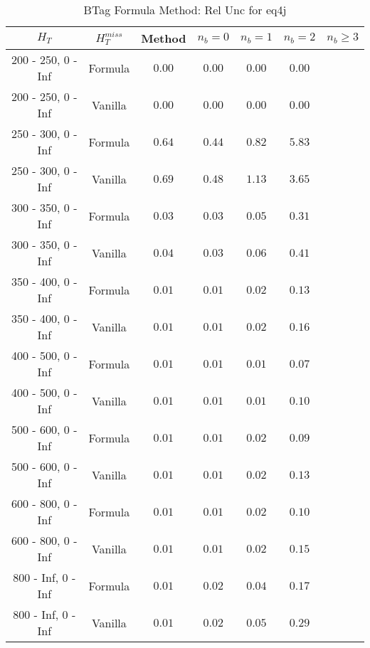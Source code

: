 \begin{longtable}{ | c | c | c | c | c | c | c | }
\caption{BTag Formula Method: Rel Unc for eq4j} \label{tab:eq4j} \\    \hline 
$H_{T}$ & $H_{T}^{miss}$ & Method & $n_{b} = 0$ & $n_{b} = 1$ & $n_{b} = 2$ & $n_{b} \ge 3$ \\ \hline 200 -  250,    0 -  Inf & Formula  & $  0.00 $ & $  0.00 $ & $  0.00 $ & $  0.00 $  \\  
 200 -  250,    0 -  Inf & Vanilla  & $  0.00 $ & $  0.00 $ & $  0.00 $ & $  0.00 $  \\ \hline 
 250 -  300,    0 -  Inf & Formula  & $  0.64 $ & $  0.44 $ & $  0.82 $ & $  5.83 $  \\  
 250 -  300,    0 -  Inf & Vanilla  & $  0.69 $ & $  0.48 $ & $  1.13 $ & $  3.65 $  \\ \hline 
 300 -  350,    0 -  Inf & Formula  & $  0.03 $ & $  0.03 $ & $  0.05 $ & $  0.31 $  \\  
 300 -  350,    0 -  Inf & Vanilla  & $  0.04 $ & $  0.03 $ & $  0.06 $ & $  0.41 $  \\ \hline 
 350 -  400,    0 -  Inf & Formula  & $  0.01 $ & $  0.01 $ & $  0.02 $ & $  0.13 $  \\  
 350 -  400,    0 -  Inf & Vanilla  & $  0.01 $ & $  0.01 $ & $  0.02 $ & $  0.16 $  \\ \hline 
 400 -  500,    0 -  Inf & Formula  & $  0.01 $ & $  0.01 $ & $  0.01 $ & $  0.07 $  \\  
 400 -  500,    0 -  Inf & Vanilla  & $  0.01 $ & $  0.01 $ & $  0.01 $ & $  0.10 $  \\ \hline 
 500 -  600,    0 -  Inf & Formula  & $  0.01 $ & $  0.01 $ & $  0.02 $ & $  0.09 $  \\  
 500 -  600,    0 -  Inf & Vanilla  & $  0.01 $ & $  0.01 $ & $  0.02 $ & $  0.13 $  \\ \hline 
 600 -  800,    0 -  Inf & Formula  & $  0.01 $ & $  0.01 $ & $  0.02 $ & $  0.10 $  \\  
 600 -  800,    0 -  Inf & Vanilla  & $  0.01 $ & $  0.01 $ & $  0.02 $ & $  0.15 $  \\ \hline 
 800 -  Inf,    0 -  Inf & Formula  & $  0.01 $ & $  0.02 $ & $  0.04 $ & $  0.17 $  \\  
 800 -  Inf,    0 -  Inf & Vanilla  & $  0.01 $ & $  0.02 $ & $  0.05 $ & $  0.29 $  \\ \hline 
    \hline 
    \hline 
\end{longtable}
